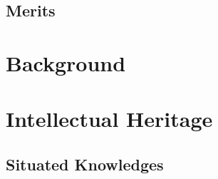\documentclass[a4paper,man,natbib]{apa6}
\begin{document}
   \subsection*{Merits}
   \pagebreak
   \section*{Background}

   \section*{Intellectual Heritage}
   \subsection*{Situated Knowledges}
\end{document}
